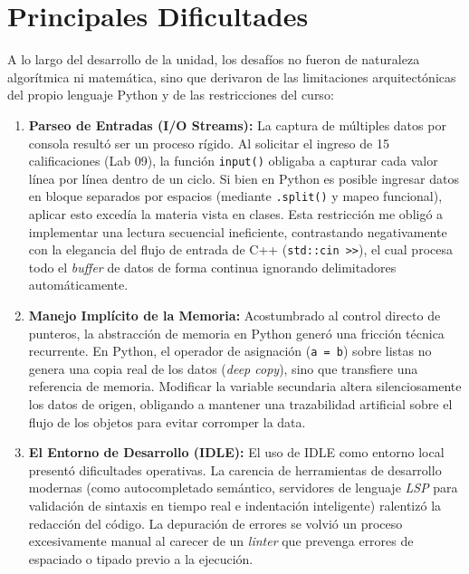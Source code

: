 \newpage

\section{Principales Dificultades}

A lo largo del desarrollo de la unidad, los desafíos no fueron de naturaleza algorítmica ni matemática, sino que derivaron de las limitaciones arquitectónicas del propio lenguaje Python y de las restricciones del curso:

\begin{enumerate}
	\item \textbf{Parseo de Entradas (I/O Streams):} La captura de múltiples datos por consola resultó ser un proceso rígido. Al solicitar el ingreso de 15 calificaciones (Lab 09), la función \texttt{input()} obligaba a capturar cada valor línea por línea dentro de un ciclo. Si bien en Python es posible ingresar datos en bloque separados por espacios (mediante \texttt{.split()} y mapeo funcional), aplicar esto excedía la materia vista en clases. Esta restricción me obligó a implementar una lectura secuencial ineficiente, contrastando negativamente con la elegancia del flujo de entrada de C++ (\texttt{std::cin \textgreater\textgreater}), el cual procesa todo el \textit{buffer} de datos de forma continua ignorando delimitadores automáticamente.

	\item \textbf{Manejo Implícito de la Memoria:} Acostumbrado al control directo de punteros, la abstracción de memoria en Python generó una fricción técnica recurrente. En Python, el operador de asignación (\texttt{a = b}) sobre listas no genera una copia real de los datos (\textit{deep copy}), sino que transfiere una referencia de memoria. Modificar la variable secundaria altera silenciosamente los datos de origen, obligando a mantener una trazabilidad artificial sobre el flujo de los objetos para evitar corromper la data.

	\item \textbf{El Entorno de Desarrollo (IDLE):} El uso de IDLE como entorno local presentó dificultades operativas. La carencia de herramientas de desarrollo modernas (como autocompletado semántico, servidores de lenguaje \textit{LSP} para validación de sintaxis en tiempo real e indentación inteligente) ralentizó la redacción del código. La depuración de errores se volvió un proceso excesivamente manual al carecer de un \textit{linter} que prevenga errores de espaciado o tipado previo a la ejecución.
\end{enumerate}


